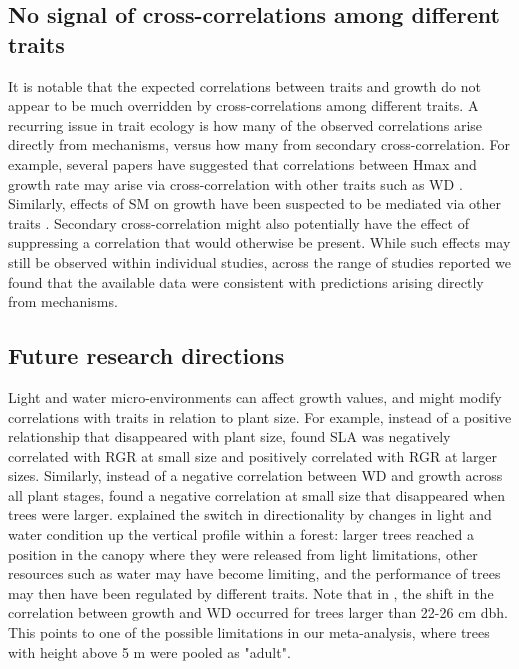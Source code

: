 \documentclass[a4paper]{article}\usepackage[]{graphicx}\usepackage[]{color}
\begin{document}
\subsection*{No signal of cross-correlations among different traits}

It is notable that the expected correlations between traits and growth do not appear to be much overridden by cross-correlations among different traits. A recurring issue in trait ecology is how many of the observed correlations arise directly from mechanisms, versus how many from secondary cross-correlation. For example, several papers have suggested that correlations between Hmax and growth rate may arise via cross-correlation with other traits such as WD \citep{Thomas:1996do, Poorter:2006vb, Wright:2010tp}. Similarly, effects of SM on growth have been suspected to be mediated via other traits \citep{Shipley:1990js,Westoby:2002ft,Poorter:2006vb}. Secondary cross-correlation might also potentially have the effect of suppressing a correlation that would otherwise be present. While such effects may still be observed within individual studies, across the range of studies reported we found that the available data were consistent with predictions arising directly from mechanisms.

\subsection*{Future research directions}

Light and water micro-environments can affect growth values, and might modify correlations with traits in relation to plant size. For example, instead of a positive relationship that disappeared with plant size, \citet{Iida:2014ep} found SLA was negatively correlated with RGR at small size and positively correlated with RGR at larger sizes. Similarly, instead of a negative correlation between WD and growth across all plant stages, \citep{Iida:2014ep,Iida:2014hq} found a negative correlation at small size that disappeared when trees were larger. \citet{Iida:2014hq} explained the switch in directionality by changes in light and water condition up the vertical profile within a forest: larger trees reached a position in the canopy where they were released from light limitations, other resources such as water may have become limiting, and the performance of trees may then have been regulated by different traits. Note that in \citet{Iida:2014hq}, the shift in the correlation between growth and WD occurred for trees larger than 22-26 cm dbh. This points to one of the possible limitations in our meta-analysis, where trees with height above 5 m were pooled as "adult".
\end{document}
